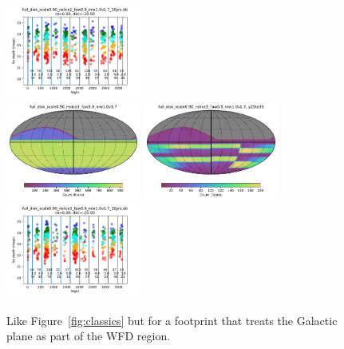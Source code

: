 \documentclass[modern]{aastex62}
\begin{document}
\begin{figure}
\includegraphics[height=1.25in, width=1.75in]{plots/full_disk_scale090_nslice2_fpw09_nrw10v17_spotc.pdf} \\
\includegraphics[height=1.25in, width=1.75in]{plots/full_disk_scale0.90_nslice3_fpw0.9_nrw1.0v1.7/full_disk_scale0_90_nslice3_fpw0_9_nrw1_0v1_7_Count_HEAL_SkyMap.pdf}
\includegraphics[height=1.25in, width=1.75in]{plots/full_disk_scale0.90_nslice3_fpw0.9_nrw1.0v1.7/full_disk_scale0_90_nslice3_fpw0_9_nrw1_0v1_7_Count_night_gt_913_125000_and_night_lt_1278_375000_and_note_not_like_DD_HEAL_SkyMap.pdf}
\includegraphics[height=1.25in, width=1.75in]{plots/full_disk_scale090_nslice3_fpw09_nrw10v17_spotc.pdf}
\caption{Like Figure~\ref{fig:classics} but for a footprint that treats the Galactic plane as part of the WFD region. \label{fig:fulldisk}}
\end{figure}
\end{document}
